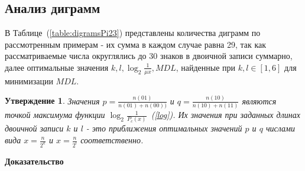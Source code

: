 \documentclass[12pt]{article}
\newtheorem{sttm}{Утверждение}
\begin{document}
	\subsection*{Анализ диграмм}
	В Таблице~(\ref{table:digramsPi23}) представлены количества диграмм по рассмотренным примерам - их сумма в каждом случае равна 29, так как рассматриваемые числа округлялись до 30 знаков в двоичной записи суммарно, далее оптимальные значения $k,l,\log_2{\frac{1}{\mu{x}}},MDL$, найденные при $k,l\in[1,6]$ для минимизации $MDL$.
	\begin{sttm}\label{derivative}Значения $p = \frac{n(01)}{n(01)+n(00))}$ и $q = \frac{n(10)}{n(10)+n(11)}$ являются точкой максимума функции $\log_2{\frac{1}{P_c(x)}}$~(\ref{log}). Их значения при заданных длинах двоичной записи $k$ и $l$ - это приближения оптимальных значений $p$ и $q$ числами вида $x=\frac{n}{2^{k}}$ и $x=\frac{n}{2^{l}}$ соответственно.\end{sttm}
	{\bf Доказательство}
\end{document}
